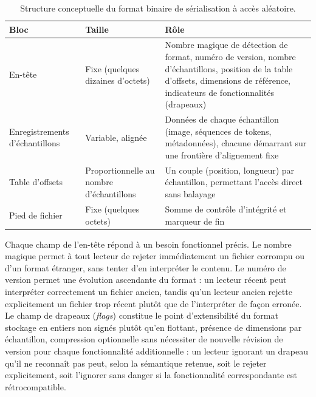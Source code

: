 \documentclass[12pt,a4paper]{report}
\begin{document}
\begin{table}[htbp]
  \centering
  \renewcommand{\arraystretch}{1.5}
  \begin{tabular}{|p{3.5cm}|p{3.5cm}|p{8cm}|}
    \hline
    \textbf{Bloc} & \textbf{Taille} & \textbf{Rôle} \\
    \hline
    En-tête & Fixe (quelques dizaines d'octets) & Nombre magique de détection de format, numéro de version, nombre d'échantillons, position de la table d'offsets, dimensions de référence, indicateurs de fonctionnalités (drapeaux) \\
    \hline
    Enregistrements d'échantillons & Variable, alignée & Données de chaque échantillon (image, séquences de tokens, métadonnées), chacune démarrant sur une frontière d'alignement fixe \\
    \hline
    Table d'offsets & Proportionnelle au nombre d'échantillons & Un couple (position, longueur) par échantillon, permettant l'accès direct sans balayage \\
    \hline
    Pied de fichier & Fixe (quelques octets) & Somme de contrôle d'intégrité et marqueur de fin \\
    \hline
  \end{tabular}
  \vspace{0.2cm}
  \caption{Structure conceptuelle du format binaire de sérialisation à accès aléatoire.}
  \label{tab:format_shard}
\end{table}

Chaque champ de l'en-tête répond à un besoin fonctionnel précis. Le nombre magique permet à tout lecteur de rejeter immédiatement un fichier corrompu ou d'un format étranger, sans tenter d'en interpréter le contenu. Le numéro de version permet une évolution ascendante du format : un lecteur récent peut interpréter correctement un fichier ancien, tandis qu'un lecteur ancien rejette explicitement un fichier trop récent plutôt que de l'interpréter de façon erronée. Le champ de drapeaux (\textit{flags}) constitue le point d'extensibilité du format stockage en entiers non signés plutôt qu'en flottant, présence de dimensions par échantillon, compression optionnelle sans nécessiter de nouvelle révision de version pour chaque fonctionnalité additionnelle : un lecteur ignorant un drapeau qu'il ne reconnaît pas peut, selon la sémantique retenue, soit le rejeter explicitement, soit l'ignorer sans danger si la fonctionnalité correspondante est rétrocompatible.
\end{document}
